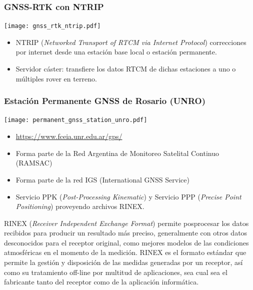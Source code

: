 \begin{frame}
{   }
\end{frame}

\begin{frame}
    \frametitle{GNSS-RTK con NTRIP}
    \begin{center}
        \texttt{[image: gnss\_rtk\_ntrip.pdf]}
    \end{center}
    
    \begin{itemize}
        \item NTRIP (\emph{Networked Transport of RTCM via Internet Protocol}) correcciones por internet desde una estación base local o estación permanente.
        \item Servidor cáster: transfiere los datos RTCM de dichas estaciones a uno o múltiples rover en terreno.
    \end{itemize}
\end{frame}

\begin{frame}
    \frametitle{Estación Permanente GNSS de Rosario (UNRO)}
    \begin{center}
        \texttt{[image: permanent\_gnss\_station\_unro.pdf]}
    \end{center}

    \begin{itemize}
        \item \href{https://www.fceia.unr.edu.ar/gps/}{https://www.fceia.unr.edu.ar/gps/}
        \item Forma parte de la Red Argentina de Monitoreo Satelital Continuo (RAMSAC)
        \item Forma parte de la red IGS (International GNSS Service)
        \item Servicio PPK (\emph{Post-Processing Kinematic}) y Servicio PPP (\emph{Precise Point Positioning}) proveyendo archivos RINEX.
    \end{itemize}
    
    RINEX (\emph{Receiver Independent Exchange Format})  permite posprocesar los datos recibidos para producir un resultado más preciso, generalmente con otros datos desconocidos para el receptor original, como mejores modelos de las condiciones atmosféricas en el momento de la medición.
    RINEX es el formato estándar que permite la gestión y disposición de las medidas generadas por un receptor, así como su tratamiento off-line por multitud de aplicaciones, sea cual sea el fabricante tanto del receptor como de la aplicación informática.

\end{frame}


